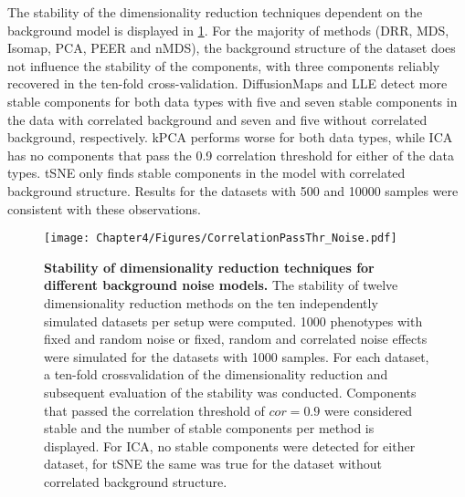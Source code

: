 The stability of the dimensionality reduction techniques dependent on the background model is displayed in \cref{fig:cor-noise}. For the majority of methods (DRR, MDS, Isomap, PCA, PEER and nMDS), the background structure of the dataset does not influence the stability of the components, with three components reliably recovered in the ten-fold cross-validation. DiffusionMaps and LLE detect more stable components for both data types with five and seven stable components in the data with correlated background and seven and five without correlated background, respectively. kPCA performs worse for both data types, while ICA has no components that pass the \num{0.9} correlation threshold for either of the data types. tSNE only finds stable components in the model with correlated background structure.  Results for the datasets with \num{500} and \num{10000} samples were consistent with these observations.

\begin{figure}[hbtp]
	\centering
	\texttt{[image: Chapter4/Figures/CorrelationPassThr\_Noise.pdf]}
	\caption[\textbf{Stability of dimensionality reduction techniques for different background noise models.}]{\textbf{Stability of dimensionality reduction techniques for different background noise models. }The stability of twelve dimensionality reduction methods on the ten independently simulated datasets per setup were computed. \num{1000} phenotypes with fixed and random noise or fixed, random and correlated noise effects were simulated for the datasets with \numlist{1000} samples. For each dataset, a ten-fold crossvalidation of the dimensionality reduction and subsequent evaluation of the stability was conducted. Components that passed the correlation threshold of \(cor=0.9\) were considered stable and the number of stable components per method is displayed. For ICA, no stable components were detected for either dataset, for tSNE the same was true for the dataset without correlated background structure.} 
	 	\label{fig:cor-noise}
\end{figure}

